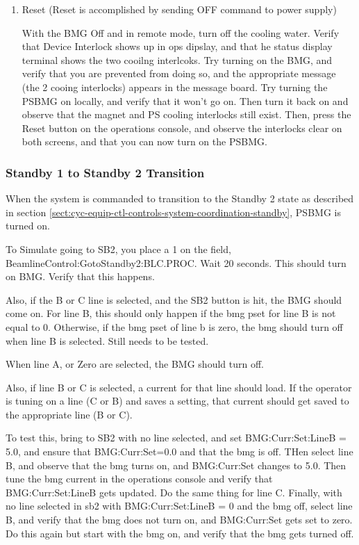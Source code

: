 \documentclass[11pt]{book}		%
\begin{document}
\begin{enumerate}
\color{black}


 \item Reset (Reset is accomplished by sending OFF command to power supply)

\color{red}

With the BMG Off and in remote mode, turn off the cooling water. Verify that Device Interlock shows up in ops dipslay, and that he status display terminal shows the two cooilng interlcoks. Try turning on the BMG, and verify that you are prevented from doing so, and the appropriate message (the 2 cooing interlocks) appears in the message board. Try turning the PSBMG on locally, and verify that it won't go on. Then turn it back on and observe that the magnet and PS cooling interlocks still exist. Then, press the Reset button on the operations console, and observe the interlocks clear on both screens, and that you can now turn on the PSBMG.

\color{black}

\end{enumerate}

\subsubsection{Standby 1 to Standby 2 Transition}

When the system is commanded to transition to the Standby 2 state as described in section \ref{sect:cyc-equip-ctl-controls-system-coordination-standby}, PSBMG is turned on.

\color{red}

To Simulate going to SB2, you place a 1 on the field, BeamlineControl:GotoStandby2:BLC.PROC. Wait 20 seconds. This should turn on BMG. Verify that this happens. 

Also, if the B or C line is selected, and the SB2 button is hit, the BMG should come on. For line B, this should only happen if the bmg pset for line B is not equal to 0. Otherwise, if the bmg pset of line b is zero, the bmg should turn off when line B is selected. Still needs to be tested.

When line A, or Zero are selected, the BMG should turn off.

Also, if line B or C is selected, a current for that line should load. If the operator is tuning on a line (C or B) and saves a setting, that current should get saved to the appropriate line (B or C).

To test this, bring to SB2 with no line selected, and set BMG:Curr:Set:LineB = 5.0, and ensure that BMG:Curr:Set=0.0 and that the bmg is off. THen select line B, and observe that the bmg turns on, and BMG:Curr:Set changes to 5.0. Then tune the bmg current in the operations console and verify that BMG:Curr:Set:LineB gets updated. Do the same thing for line C. Finally, with no line selected in sb2 with BMG:Curr:Set:LineB = 0 and the bmg off, select line B, and verify that the bmg does not turn on, and BMG:Curr:Set gets set to zero. Do this again but start with the bmg on, and verify that the bmg gets turned off.
\end{document}
